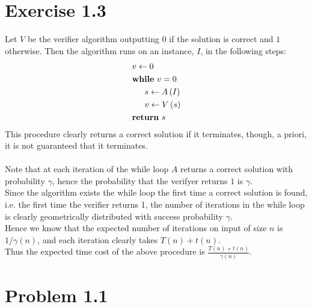 \section*{Exercise 1.3}
Let $V$ be the verifier algorithm outputting $0$ if the solution is correct and $1$ otherwise. 
Then the algorithm runs on an instance, $I$, in the following steps:
\begin{align*}
	& v \leftarrow 0 \\
	& \textbf{while} \ v =0 \\
	& \indent s \leftarrow A\left( I \right) \\
	& \indent v \leftarrow V\left( s \right) \\
	& \textbf{return} \ s
\end{align*}
This procedure clearly returns a correct solution if it terminates, 
though, a priori, it is not guaranteed that it terminates. \\ \\
Note that at each iteration of the while loop $A$ returns a correct solution with probability $\gamma$,
hence the probability that the verifyer returns $1$ is $\gamma$. \\
Since the algorithm exists the while loop the first time a correct solution is found, i.e. the first time the verifier returns 1,
the number of iterations in the while loop is clearly geometrically distributed with success probability $\gamma$. \\
Hence we know that the expected number of iterations on input of size $n$ is $1/\gamma(n)$,
and each iteration clearly takes $T(n)+t(n)$. \\
Thus the expected time cost of the above procedure is $\frac{T(n)+t(n)}{\gamma(n)}$.
\section*{Problem 1.1}
